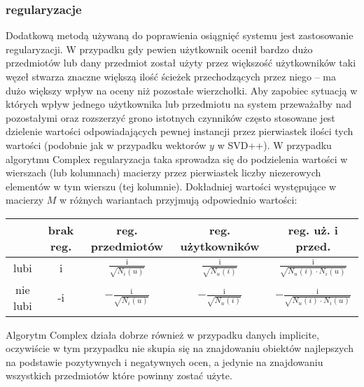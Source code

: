 \documentclass{pracamgr}
\begin{document}
    \subsubsection{regularyzacje}
     Dodatkową metodą używaną do poprawienia osiągnięć systemu jest zastosowanie regularyzacji.
     W przypadku gdy pewien użytkownik ocenił bardzo dużo przedmiotów lub dany przedmiot został użyty przez większość użytkowników taki węzeł
     stwarza znaczne większą ilość ścieżek przechodzących przez niego -- ma dużo większy wpływ na oceny niż pozostałe wierzchołki.
     Aby zapobiec sytuacją w których wpływ jednego użytkownika lub przedmiotu na system przeważałby nad pozostałymi oraz rozszerzyć
     grono istotnych czynników często stosowane jest dzielenie wartości odpowiadających pewnej instancji przez pierwiastek ilości tych wartości
     (podobnie jak w przypadku wektorów $y$ w SVD++).
     W przypadku algorytmu Complex regularyzacja taka sprowadza się do podzielenia wartości w wierszach (lub kolumnach) macierzy przez pierwiastek liczby
     niezerowych elementów w tym wierszu (tej kolumnie). Dokładniej wartości występujące w macierzy $M$ w różnych wariantach przyjmują odpowiednio
     wartości:
     \begin{center}
      \begin{tabular}{|c|c|c|c|c|}
       \hline
         & brak reg. & reg. przedmiotów & reg. użytkowników & reg. uż. i przed. \\
       \hline
        lubi & i &  $\frac{\text{i}}{\sqrt{N_{i}(u)}}$& $\frac{\text{i}}{\sqrt{N_{u}(i)}}$ & $\frac{\text{i}}{\sqrt{N_{u}(i)\cdot N_{i}(u)}}$  \\
       \hline
        nie lubi & -i & $-\frac{\text{i}}{\sqrt{N_{i}(u)}}$ &  $-\frac{\text{i}}{\sqrt{N_{u}(i)}}$ & $-\frac{\text{i}}{\sqrt{N_{u}(i)\cdot N_{i}(u)}}$  \\    
       \hline
      \end{tabular}
     \end{center}
     \vspace{16pt}
     Algorytm Complex działa dobrze również w przypadku danych implicite, oczywiście w tym przypadku nie skupia się na znajdowaniu obiektów najlepszych
     na podstawie pozytywnych i negatywnych ocen, a jedynie na znajdowaniu wszystkich przedmiotów które powinny zostać użyte.\newpage
    
\end{document}
